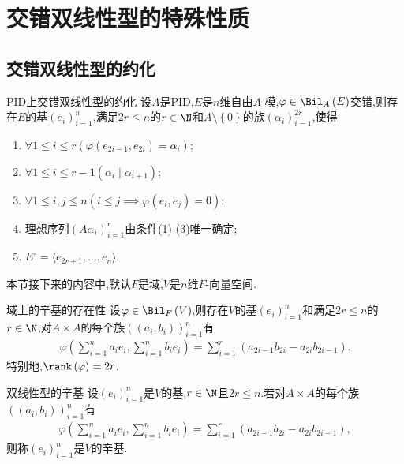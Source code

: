 \chapter{交错双线性型的特殊性质}

\section{交错双线性型的约化}

\begin{theorem}{PID上交错双线性型的约化}{}
	设$A$是PID,$E$是$n$维自由$A$-模,$\varphi\in\Bil_{A}\left(E\right)$交错,则存在$E$的基$\left(e_{i}\right)_{i=1}^{n}$,满足$2r\leq n$的$r\in\N$和$A\setminus\left\{0\right\}$的族$\left(\alpha_{i}\right)_{i=1}^{2r}$,使得
	\begin{enumerate}
		\item $\forall 1\leq i\leq r\left(\varphi\left(e_{2i-1},e_{2i}\right)=\alpha_{i}\right)$;
		\item $\forall 1\leq i\leq r-1\left(\alpha_{i}\mid\alpha_{i+1}\right)$;
		\item $\forall 1\leq i,j\leq n\left(i\leq j\implies\varphi\left(e_{i},e_{j}\right)=0\right)$;
		\item 理想序列$\left(A\alpha_{i}\right)_{i=1}^{r}$由条件(1)-(3)唯一确定;
		\item $E^{\circ}=\langle e_{2r+1},\ldots,e_{n}\rangle$.
	\end{enumerate}
\end{theorem}

本节接下来的内容中,默认$F$是域,$V$是$n$维$F$-向量空间.

\begin{corollary}{域上的辛基的存在性}{}
	设$\varphi\in\Bil_{F}\left(V\right)$,则存在$V$的基$\left(e_{i}\right)_{i=1}^{n}$和满足$2r\leq n$的$r\in\N$,对$A\times A$的每个族$\left(\left(a_{i},b_{i}\right)\right)_{i=1}^{n}$有
	\begin{align*}
		\varphi\left(\sum\limits_{i=1}^{n}a_{i}e_{i},\sum\limits_{i=1}^{n}b_{i}e_{i}\right)=\sum\limits_{i=1}^{r}\left(a_{2i-1}b_{2i}-a_{2i}b_{2i-1}\right).
	\end{align*}
	特别地,$\rank\left(\varphi\right)=2r$.
\end{corollary}

\begin{definition}{双线性型的辛基}{}
	设$\left(e_{i}\right)_{i=1}^{n}$是$V$的基,$r\in\N$且$2r\leq n$.若对$A\times A$的每个族$\left(\left(a_{i},b_{i}\right)\right)_{i=1}^{n}$有
	\begin{align*}
		\varphi\left(\sum\limits_{i=1}^{n}a_{i}e_{i},\sum\limits_{i=1}^{n}b_{i}e_{i}\right)=\sum\limits_{i=1}^{r}\left(a_{2i-1}b_{2i}-a_{2i}b_{2i-1}\right),
	\end{align*}
	则称$\left(e_{i}\right)_{i=1}^{n}$是$V$的辛基.
\end{definition}

